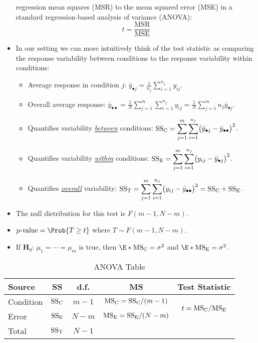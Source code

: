 \begin{itemize}
            regression mean squares (MSR)
            to the mean squared error (MSE) in a standard regression-based analysis of variance (ANOVA):
            \[ t=\frac{\text{MSR}}{\text{MSE}} \]
      \item In our setting we can more intuitively think of the test
            statistic as comparing the response variability
            between conditions to the response variability within conditions:
            \begin{itemize}
                  \item Average response in condition $ j $: $ \displaystyle \bar{y}_{\bullet j}=\frac{1}{n_j} \sum_{i=1}^{n_j} y_{ij} $.
                  \item Overall average response: $ \displaystyle \bar{y}_{\bullet\bullet}=\frac{1}{N} \sum_{j=1}^{m} \sum_{i=1}^{n_j} y_{ij}=\frac{1}{N} \sum_{j=1}^{m} n_j\bar{y}_{\bullet j} $.
                  \item Quantifies variability \underline{\emph{between}} conditions:
                        $ \displaystyle \text{SS}_{\text{C}}=\sum_{j=1}^{m} \sum_{i=1}^{n_j} \bigl(\bar{y}_{\bullet j}-\bar{y}_{\bullet\bullet}\bigr)^2 $.
                  \item Quantifies variability \underline{\emph{within}} conditions:
                        $ \displaystyle \text{SS}_{\text{E}}=\sum_{j=1}^{m} \sum_{i=1}^{n_j} \bigl(y_{ij}-\bar{y}_{\bullet j}\bigr)^2 $.
                  \item Quantifies \underline{\emph{overall}} variability:
                        $ \displaystyle \text{SS}_{\text{T}}=\sum_{j=1}^{m} \sum_{i=1}^{n_j} \bigl(y_{ij}-\bar{y}_{\bullet\bullet}\bigr)^2=\text{SS}_{\text{C}}+\text{SS}_{\text{E}} $.
            \end{itemize}
      \item The null distribution for this test is $ F(m-1,N-m) $.
      \item $ p\text{-value}=\Prob{T\ge t} $ where $ T \sim F(m-1,N-m) $.
      \item If $ \mathbf{H}_0 $: $ \mu_1=\cdots=\mu_m $ is true, then $ \E*{\MSC}=\sigma^2 $ and $ \E*{\MSE}=\sigma^2 $.
\end{itemize}
\begin{table}[!htbp]
      \centering
      \caption{ANOVA Table}
      \begin{NiceTabular}{|l|c|c|c|c|}
            \toprule
            Source    & SS                     & d.f.    & MS                                                               & Test Statistic                                                   \\
            \midrule
            Condition & $ \text{SS}_{\text{C}} $ & $ m-1 $ & $ \text{MS}_{\text{C}}=\text{SS}_{\text{C}}/(m-1) $ &  \\
            Error     & $ \text{SS}_{\text{E}} $ & $ N-m $ & $ \text{MS}_{\text{E}}=\text{SS}_{\text{E}}/(N-m) $                                                               \\
            \midrule
            Total     & $ \text{SS}_{\text{T}} $ & $ N-1 $\\
            \bottomrule
      \end{NiceTabular}
\end{table}
\newpage
